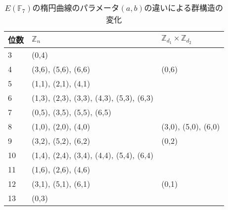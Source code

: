 \begin{table}[htb]\label{table:EFF_7}
\begin{center}
\caption{$E(\mathbb{F}_7)$の楕円曲線のパラメータ$(a,b)$の違いによる群構造の変化}
\begin{tabular}{|l|l|l|}\hline
位数 & $\mathbb{Z}_n$                         & $\mathbb{Z}_{d_1}\times\mathbb{Z}_{d_2}$ \\\hline\hline
3  & (0,4)                                    &                                          \\\hline
4  & (3,6), (5,6), (6,6)                      & (0,6)                                    \\\hline
5  & (1,1), (2,1), (4,1)                      &                                          \\\hline
6  & (1,3), (2,3), (3,3), (4,3), (5,3), (6,3) &                                          \\\hline
7  & (0,5), (3,5), (5,5), (6,5)               &                                          \\\hline
8  & (1,0), (2,0), (4,0)                      & (3,0), (5,0), (6,0)                      \\\hline
9  & (3,2), (5,2), (6,2)                      & (0,2)                                    \\\hline
10 & (1,4), (2,4), (3,4), (4,4), (5,4), (6,4) &                                          \\\hline
11 & (1,6), (2,6), (4,6)                      &                                          \\\hline
12 & (3,1), (5,1), (6,1)                      & (0,1)                                    \\\hline
13 & (0,3)                                    &                                          \\\hline
\end{tabular}
\end{center}
\end{table}

